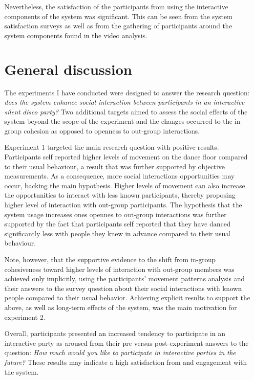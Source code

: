 \documentclass[a4paper,11pt]{article}
\begin{document}
{Nevertheless, the satisfaction of the participants from using the interactive components of the system was significant.
This can be seen from the system satisfaction surveys as well as from the gathering of participants around the system components found in the video analysis.

\section{General discussion}

The experiments I have conducted were designed to answer the research question: \emph{does the system enhance social interaction between participants in an interactive silent disco party?}
Two additional targets aimed to assess the social effects of the system beyond the scope of the experiment and the changes occurred to the in-group cohesion as opposed to openness to out-group interactions.

Experiment 1 targeted the main research question with positive results.
Participants self reported higher levels of movement on the dance floor compared to their usual behaviour, a result that was further supported by objective measurements.
As a consequence, more social interactions opportunities may occur, backing the main hypothesis.
Higher levels of movement can also increase the opportunities to interact with less known participants, thereby proposing higher level of interaction with out-group participants.
The hypothesis that the system usage increases ones opennes to out-group interactions was further supported by the fact that participants self reported that they have danced significantly less with people they knew in advance compared to their usual behaviour.

Note, however, that the supportive evidence to the shift from in-group cohesiveness toward higher levels of interaction with out-group members was achieved only implicitly, using the participants' movement patterns analysis and their answers to the survey question about their social interactions with known people compared to their usual behavior.
Achieving explicit results to support the above, as well as long-term effects of the system, was the main motivation for experiment 2.

Overall, participants presented an increased tendency to participate in an interactive party as aroused from their pre versus post-experiment answers to the question: \emph{How much would you like to participate in interactive parties in the future?}
These results may indicate a high satisfaction from and engagement with the system.

}
\end{document}
